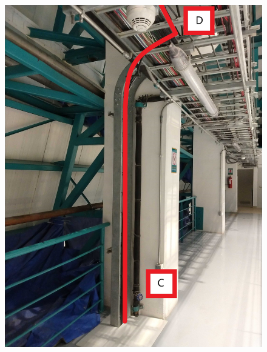 \begin{figure}
  \includegraphics[width=\textwidth]{images/14.jpg}
  \label{fig:jlsimon}
\end{figure}

